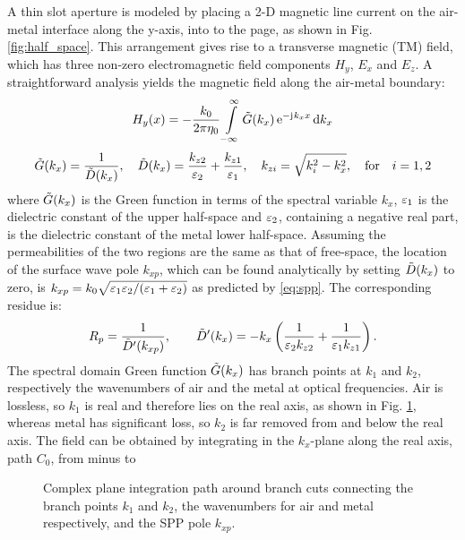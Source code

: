 \documentclass[11pt]{article}
\begin{document}
A thin slot aperture is modeled by placing a 2-D magnetic line current on the air-metal interface along the y-axis, into to the page, as shown in Fig. \ref{fig:half_space}. This arrangement gives rise to a transverse magnetic (TM) field, which has three non-zero electromagnetic field components $H_y$, $E_x$ and $E_z$. A straightforward analysis yields the magnetic field along the air-metal boundary:
%
\begin{equation}
  H_y(x) =  - \frac{k_0}{2 \pi \eta_0} \int\limits_{-\infty}^\infty  \tilde{G}(k_x) \, \mathrm{e}^{ - \mathrm{j}\mkern1mu k_x x} \mathop{}\!\mathrm{d} {k_x}
  \label{eq:Sommerfeld}
\end{equation}
%
\begin{equation}
  \tilde{G}(k_x) = \frac{1}{\tilde{D}(k_x)}, \quad
  \tilde{D}(k_x) = \frac{k_{z2}}{\varepsilon_2} + \frac{k_{z1}}{\varepsilon_1}, \quad
  k_{zi} = \sqrt{k_i^2 - k_x^2}, \quad \text{for} \quad i=1,2
  \label{eq:somm_details}
\end{equation}
%
where $\tilde{G}(k_x)$ is the Green function in terms of the spectral variable $k_x$, $\varepsilon_1$ is the dielectric constant of the upper half-space and $\varepsilon_2$, containing a negative real part, is the dielectric constant of the metal lower half-space. Assuming the permeabilities of the two regions are the same as that of free-space, the location of the surface wave pole $k_{xp}$, which can be found analytically by setting $\tilde{D}(k_x)$ to zero, is
$k_{xp} = k_0 \sqrt{ \varepsilon_1 \varepsilon_2 /{(\varepsilon_1 + \varepsilon_2)}}$ as predicted by \eqref{eq:spp}. The corresponding residue is:
%
\begin{equation}
  R_p = \frac{1}{\tilde{D}'(k_{xp})}, \qquad
  \tilde{D}'(k_x) =  -{k_x}\left( \frac{1}{\varepsilon_2 k_{z2}} + \frac{1}{\varepsilon_1 k_{z1}} \right).
  \label{eq:residue}
\end{equation}
%
The spectral domain Green function $\tilde{G}(k_x)$ has branch points at $k_1$ and  $k_2$, respectively the wavenumbers of air and the metal at optical frequencies. Air is lossless, so $k_1$ is real and therefore lies on the real axis, as shown in Fig. \ref{fig:contour}, whereas metal has significant loss, so $k_2$ is far removed from and below the real axis. The field can be obtained by integrating in the $k_x$-plane along the real axis, path $C_0$, from minus to
%
\begin{figure}[h!]
  \centering
  \def\svgwidth{.5\linewidth}
  
  \caption{Complex plane integration path around branch cuts connecting the branch points $k_1$ and $k_2$, the wavenumbers for air and metal respectively, and the SPP pole $k_{xp}$.}
  \label{fig:contour}
\end{figure}
\end{document}
